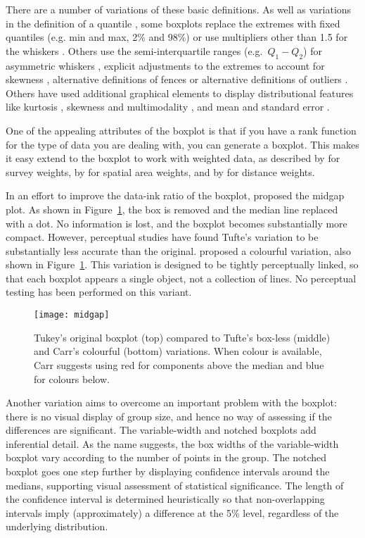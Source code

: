 \documentclass[oneside]{article}
\begin{document}
There are a number of variations of these basic definitions. As well as variations in the definition of a quantile \citep{hyndman:1996}, some boxplots replace the extremes with fixed quantiles (e.g. min and max, 2\% and 98\%) or use multipliers other than 1.5 for the whiskers \citep{frigge:1989}. Others use the semi-interquartile ranges (e.g.\ $Q_1 - Q_2$) for asymmetric whiskers \citep{rousseuw:1999}, explicit adjustments to the extremes to account for skewness \citep{hubert:2008}, alternative definitions of fences \citep{dumbgen:2007} or alternative definitions of outliers \citep{schwertman:2004,carter:2009}. Others have used additional graphical elements to display distributional features like kurtosis \citep{aslam:1991}, skewness and multimodality \citep{choonpradub:2005}, and mean and standard error \citep{marmolejo-ramos:2010}.

One of the appealing attributes of the boxplot is that if you have a rank function for the type of data you are dealing with, you can generate a boxplot. This makes it easy extend to the boxplot to work with weighted data, as described by \citet{survey,korn:1998} for survey weights, by \citet{willmott:2007} for spatial area weights, and by \citet{dykes:2007} for distance weights.

In an effort to improve the data-ink ratio of the boxplot, \citep{tufte:2001} proposed the midgap plot. As shown in Figure~\ref{fig:tufte}, the box is removed and the median line replaced with a dot. No information is lost, and the boxplot becomes substantially more compact. However, perceptual studies \citep{stock:1991} have found Tufte's variation to be substantially less accurate than the original. \citet{carr:1994a} proposed a colourful variation, also shown in Figure~\ref{fig:tufte}. This variation is designed to be tightly perceptually linked, so that each boxplot appears a single object, not a collection of lines. No perceptual testing has been performed on this variant.

\begin{figure}[htbp]
  \centering
  \texttt{[image: midgap]}
  \caption{Tukey's original boxplot (top) compared to Tufte's box-less (middle) and Carr's colourful (bottom) variations. When colour is available, Carr suggests using red for components above the median and blue for colours below.}
  \label{fig:tufte}
\end{figure}

Another variation aims to overcome an important problem with the boxplot: there is no visual display of group size, and hence no way of assessing if the differences are significant. The variable-width and notched boxplots \citep{mcgill:1978} add inferential detail. As the name suggests, the box widths of the variable-width boxplot vary according to the number of points in the group. The notched boxplot goes one step further by displaying confidence intervals around the medians, supporting visual assessment of statistical significance. The length of the confidence interval is determined heuristically so that non-overlapping intervals imply (approximately) a difference at the 5\% level, regardless of the underlying distribution.
\end{document}
